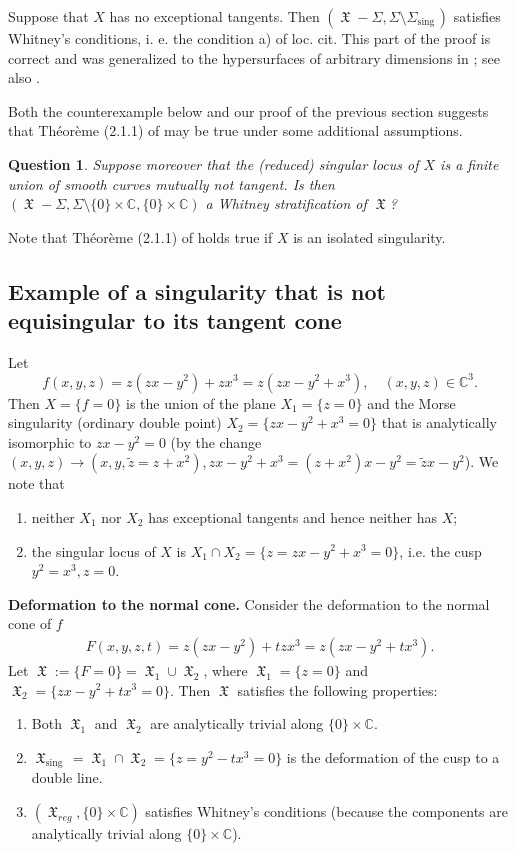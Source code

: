 \documentclass[12pt]{amsart}
\newtheorem*{xque}{Question}
\theoremstyle{definition}
\numberwithin{equation}{section}
\newcommand{\C}{\mathbb{C}}
\DeclareMathOperator{\sing}{sing \, }
\DeclareMathOperator{\frakX}{\mathfrak {X}}
\begin{document}
Suppose that $X$ has no exceptional tangents.
Then $(\frakX - \Sigma, \Sigma \setminus \Sigma_{\sing})$ satisfies Whitney's conditions, i. e. the condition a) of loc. cit.  This part of the proof is correct and was generalized to the hypersurfaces of arbitrary dimensions in \cite{Flo13}; see also \cite{FT18}. 

Both the counterexample below and our proof of the previous section suggests that Théorème (2.1.1) of \cite{LT79} may be true under some additional assumptions. 


\begin{xque}
Suppose moreover that the (reduced) singular locus of $X$ is a finite union of smooth curves mutually not tangent.  Is then $(\frakX - \Sigma, \Sigma \setminus \{0\} \times \C, \{0\} \times \C)$ a Whitney stratification of $\frakX$? 
\end{xque}

Note that Théorème (2.1.1) of \cite{LT79} holds true if $X$ is an isolated singularity.  

\subsection{Example of a singularity that is not equisingular to its tangent cone}
Let 
$$f(x,y,z)=z(zx-y^2)+zx^3=z(zx-y^2+x^3), \quad (x,y,z)\in \mathbb C^3.$$
  Then $X=\{f=0\}$ is the union of the plane $X_1=\{z=0\}$ and the Morse singularity (ordinary double point) $X_2=\{zx-y^2+x^3=0\}$ that is analytically isomorphic to $zx-y^2=0$ (by the change $(x,y,z)\to (x,y,\tilde z=z+x^2), zx-y^2+x^3=(z+x^2)x-y^2=\tilde z x-y^2$).  
We note that 
\begin{enumerate}
  \item
neither $X_1$ nor $X_2$ has exceptional tangents and hence neither has $X$;
\item
the singular locus of $X$ is  $X_1\cap X_2=\{z=zx-y^2+x^3=0\}$, i.e. the cusp $y^2=x^3, z=0$.
\end{enumerate}

\bigskip
\noindent
{\bf Deformation to the normal cone.} 
Consider the deformation to the normal cone of $f$
\begin{align}\label{eq:deform}
F(x,y,z,t)=z(zx-y^2)+tzx^3=z(zx-y^2+tx^3).
\end{align}
Let
$\frakX:=\{F=0\}=\frakX_1\cup \frakX_2$, where $\frakX_1=\{z=0\}$ and $\frakX_2=\{zx-y^2+tx^3=0\}$. Then $\frakX$ satisfies the following properties:
\begin{enumerate}
  \item
Both $\frakX_1 $ and $ \frakX_2$ are analytically trivial along $ \{0\}\times \C$.
 \item
$\frakX_{\sing} =\frakX_1\cap \frakX_2=\{z=y^2-tx^3=0\}$ is the deformation of the cusp to a double line.
 \item
  $(\frakX_{reg} ,\{0\}\times \C)$ satisfies Whitney's conditions (because the components are analytically trivial along  $ \{0\}\times \C$).
 \end{enumerate}
\end{document}
